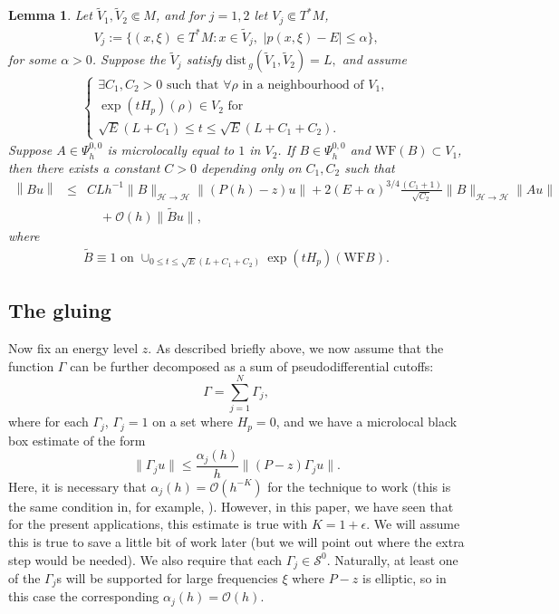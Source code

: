 \documentclass[twoside, final]{amsart}
\newtheorem{lemma}[proposition]{Lemma}
\theoremstyle{definition}
\numberwithin{equation}{section}
\begin{document}
\begin{lemma}
\label{wf-lemma-2}
Let $\widetilde{V}_1, \widetilde{V}_2
\Subset M$, and for $j = 1,2$ let $V_j \Subset T^*M$,
\begin{eqnarray*}
V_j := \{ (x, \xi) \in T^*M : x \in \widetilde{V}_j, \,\, |p(x,\xi)
-E| {\leqslant} \alpha \}, 
\end{eqnarray*}
for some $\alpha>0$.  
Suppose the $\widetilde{V}_j$ satisfy ${\text{dist}\,}_g(\widetilde{V}_1, \widetilde{V}_2) =
L,$ and assume 
\begin{eqnarray}
\label{dyn-assumption-10}
\left\{ \begin{array}{l}
\exists C_1,C_2 >0 \text{ such that }
\forall \rho \text{ in a neighbourhood of } V_1, \\
\exp( t H_p)(\rho) \in  V_2 \text{ for } \\
\sqrt{E}(L + C_1) {\leqslant}  t
{\leqslant} \sqrt{E}(L + C_1 + C_2).
\end{array} \right.
\end{eqnarray}
Suppose $A\in \Psi_h^{0,0}$ is microlocally equal to $1$ in $V_2  $.
If $B \in \Psi_h^{0,0}$ and ${\mathrm{WF}} (B) \subset V_1$, then there exists a
constant $C>0$ depending only on $C_1, C_2$ such that
\begin{eqnarray*}
\left\| Bu \right\| 
& {\leqslant} & C L h^{-1} \|B \|_{{\mathcal{H}} \to {\mathcal{H}}}  \left\| (P(h)-z)u
\right\| + 2 (E + \alpha)^{3/4} \frac{(C_1+1)}{\sqrt{C_2}} \|B\|_{{\mathcal{H}}
  \to {\mathcal{H}}} \| Au \|  \\
&& \quad + {{\mathcal O}} (h) \|\widetilde{B} u\|,
\end{eqnarray*}
where 
\begin{eqnarray*}
\widetilde{B} \equiv 1 \text{ on } \cup_{0 {\leqslant} t {\leqslant} \sqrt{E}(L + C_1 + C_2)} \exp( t H_p)(
{\mathrm{WF}} B).
\end{eqnarray*}
\end{lemma}

\subsection{The gluing}

Now fix an energy level $z$.  
As described briefly above, we now assume that the function $\Gamma$
can be further decomposed as a sum of pseudodifferential cutoffs:
\[
\Gamma =  \sum_{j = 1}^N \Gamma_j,
\]
where for each $\Gamma_j$, $\Gamma_j = 1$ on a set where $H_p = 0$,
and we have a microlocal black
box estimate of the form
\[
\| \Gamma_j u \| {\leqslant} \frac{\alpha_j(h)}{h} \|(P-z) \Gamma_j u \|.
\]
Here, it is necessary that $\alpha_j(h) = {{\mathcal O}}(h^{-K})$ for the
technique to work (this is the same condition in, for example,
\cite{DaVa-gluing}).  However, in this paper, we have seen that for
the present applications, this 
estimate is true with $K = 1 + \epsilon$.  We will assume this is true
to save a little bit of work later (but we will point out where the
extra step would be needed).  We also require that each
$\Gamma_j \in {{\mathcal S}}^0$.  Naturally, at least one of the $\Gamma_j$s will
be supported for large frequencies $\xi$ where $P-z$ is elliptic, so
in this case the corresponding $\alpha_j(h)= {{\mathcal O}}(h)$.
\end{document}
